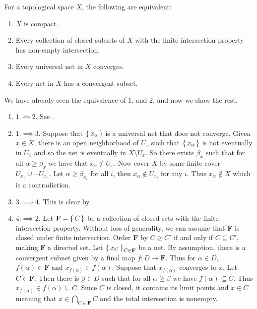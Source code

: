 \documentclass[letterpaper, 11pt]{article}
\begin{document}
\begin{thrm}\label{thrm: compact_iff_FIP_iff_universal_etc}
  For a topological space $X$, the following are equivalent:
  \begin{enumerate}
  \item $X$ is compact.
  \item Every collection of closed subsets of $X$ with the finite intersection property has non-empty intersection.
  \item Every universal net in $X$ converges.
  \item Every net in $X$ has a convergent subset.
  \end{enumerate}
\end{thrm}
\begin{pf}
  We have already seen the equivalence of $1.$ and $2.$ and now we show the rest.
  \begin{enumerate}
  \item[] $1. \iff 2.$ See .
  \item[] $1. \implies 3.$ Suppose that $\set{x_{\alpha}}$ is a universal net that does not converge.
        Given $x \in X$, there is an open neighborhood of $U_{x}$ such that $\set{x_{\alpha}}$ is not eventually in  $U_{x}$ and so the net is eventually in $X \setminus U_{x}$.
        So there exists $\beta_{x}$ such that for all $\alpha \geq \beta_{x}$ we have that $x_{\alpha} \notin U_{x}$.
        Now cover $X$ by some finite cover $U_{x_{1}} \cup \cdots U_{x_{n}}$.
        Let $\alpha \geq \beta_{x_{i}}$ for all $i$, then $x_{\alpha} \notin U_{x_{i}}$ for any $i$.
        Thus $x_{\alpha} \notin X$ which is a contradiction.
  \item[] $3. \implies 4.$ This is clear by .

\clearpage

  \item[] $4. \implies 2.$ Let $\textbf{F} = \set{C}$ be a collection of closed sets with the finite intersection property.
        Without loss of generality, we can assume that \textbf{F} is closed under finite intersection.
        Order \textbf{F} by $C \geq C'$ if and only if $C \subseteq C'$, making \textbf{F} a directed set.
        Let $\set{x_{C}}_{C \in \textbf{F}}$ be a net.
        By assumption. there is a convergent subnet given by a final map $f\colon D \to \textbf{F}$.
        Thus for $\alpha \in D$, $f(\alpha) \in \textbf{F}$ and $x_{f(\alpha)} \in f(\alpha)$.
        Suppose that $x_{f(\alpha)}$ converges to $x$.
        Let $C \in \textbf{F}$.
        Then there is $\beta \in D$ such that for all $\alpha \geq \beta$ we have $f(\alpha) \subseteq C$.
        Thus $x_{f(\alpha)} \in f(\alpha) \subseteq C$.
        Since $C$ is closed, it contains its limit points and $x \in C$ meaning that $x \in \bigcap_{C \in \textbf{F}} C$ and the total intersection is nonempty.
  \end{enumerate}
\end{pf}
\end{document}
